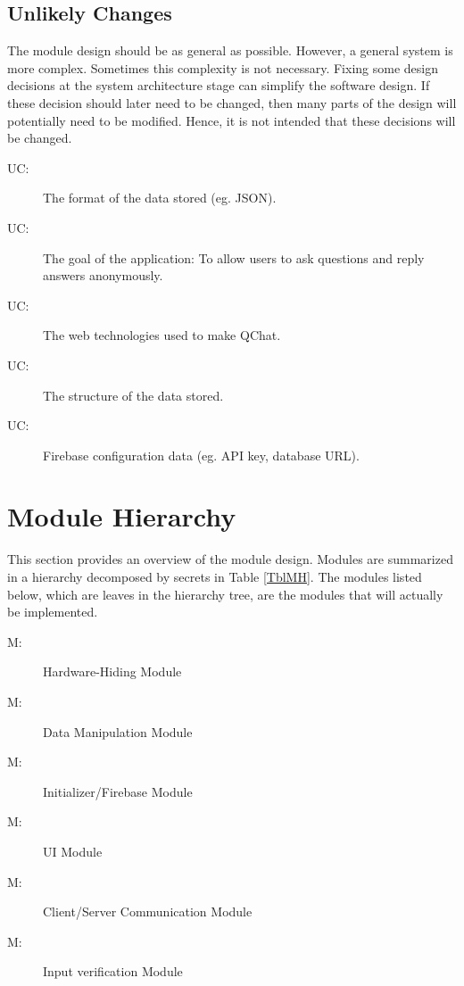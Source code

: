\documentclass[12pt, titlepage]{article}
\newcounter{ucnum}
\newcommand{\uctheucnum}{UC\theucnum}
\newcounter{mnum}
\newcommand{\mthemnum}{M\themnum}
\begin{document}
\subsection{Unlikely Changes} \label{SecUchange}

The module design should be as general as possible. However, a general system is
more complex. Sometimes this complexity is not necessary. Fixing some design
decisions at the system architecture stage can simplify the software design. If
these decision should later need to be changed, then many parts of the design
will potentially need to be modified. Hence, it is not intended that these
decisions will be changed.

\begin{description}
\item[ \uctheucnum \label{ucIO}:] The format of the data stored (eg. JSON).
\item[ \uctheucnum \label{ucInput}:] The goal of the application: To allow users to ask questions and reply answers anonymously.
\item[ \uctheucnum \label{ucInput}:] The web technologies used to make QChat.
\item[ \uctheucnum \label{ucInput}:] The structure of the data stored.
\item[ \uctheucnum \label{ucInput}:] Firebase configuration data (eg. API key, database URL).
\end{description}

\section{Module Hierarchy} \label{SecMH}

This section provides an overview of the module design. Modules are summarized
in a hierarchy decomposed by secrets in Table \ref{TblMH}. The modules listed
below, which are leaves in the hierarchy tree, are the modules that will
actually be implemented.

\begin{description}
\item [ \mthemnum \label{mHH}:] Hardware-Hiding Module
\item [ \mthemnum \label{mDM}:] Data Manipulation Module
\item [ \mthemnum \label{mIF}:] Initializer/Firebase Module
\item [ \mthemnum \label{mUI}:] UI Module
\item [ \mthemnum \label{mCS}:] Client/Server Communication Module
\item [ \mthemnum \label{mIV}:] Input verification Module
\end{description}
\end{document}
